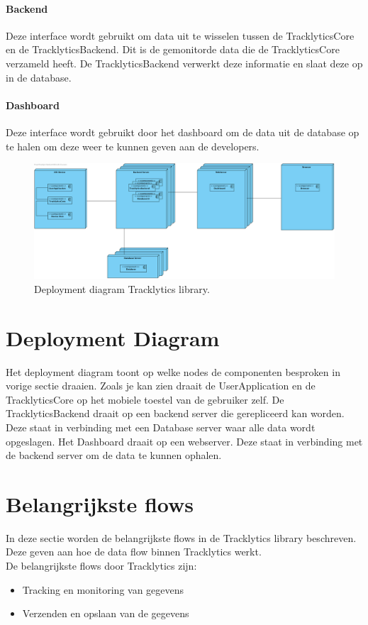\paragraph{Backend}
Deze interface wordt gebruikt om data uit te wisselen tussen de TracklyticsCore en de TracklyticsBackend. Dit is de gemonitorde data die de TracklyticsCore verzameld heeft. De TracklyticsBackend verwerkt deze informatie en slaat deze op in de database.\\

\paragraph{Dashboard}
Deze interface wordt gebruikt door het dashboard om de data uit de database op te halen om deze weer te kunnen geven aan de developers. 





\begin{figure}[!h]
  \centering
  \includegraphics[scale=0.30]{Afbeeldingen/Architectuur/Deployment}
  \caption{Deployment diagram Tracklytics library.}
  \label{fig:deployment}
\end{figure}
\section{Deployment Diagram}
Het deployment diagram toont op welke nodes de componenten besproken in vorige sectie draaien. Zoals je kan zien draait de UserApplication en de TracklyticsCore op het mobiele toestel van de gebruiker zelf. De TracklyticsBackend draait op een backend server die gerepliceerd kan worden. Deze staat in verbinding met een Database server waar alle data wordt opgeslagen. Het Dashboard draait op een webserver. Deze staat in verbinding met de backend server om de data te kunnen ophalen.

\section{Belangrijkste flows}
In deze sectie worden de belangrijkste flows in de Tracklytics library beschreven. Deze geven aan hoe de data flow binnen Tracklytics werkt.\\
De belangrijkste flows door Tracklytics zijn:
\begin{itemize}
\item Tracking en monitoring van gegevens
\item Verzenden en opslaan van de gegevens
\end{itemize} 


